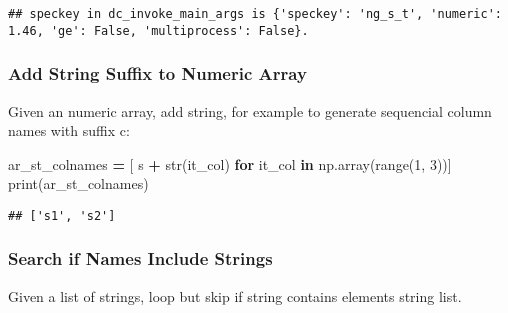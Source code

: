 \documentclass[
]{book}
\newenvironment{Shaded}{\begin{snugshade}}{\end{snugshade}}
\newcommand{\BuiltInTok}[1]{#1}
\newcommand{\ControlFlowTok}[1]{\textcolor[rgb]{0.13,0.29,0.53}{\textbf{#1}}}
\newcommand{\DecValTok}[1]{\textcolor[rgb]{0.00,0.00,0.81}{#1}}
\newcommand{\KeywordTok}[1]{\textcolor[rgb]{0.13,0.29,0.53}{\textbf{#1}}}
\newcommand{\NormalTok}[1]{#1}
\newcommand{\OperatorTok}[1]{\textcolor[rgb]{0.81,0.36,0.00}{\textbf{#1}}}
\newcommand{\StringTok}[1]{\textcolor[rgb]{0.31,0.60,0.02}{#1}}
\begin{document}
\begin{verbatim}
## speckey in dc_invoke_main_args is {'speckey': 'ng_s_t', 'numeric': 1.46, 'ge': False, 'multiprocess': False}.
\end{verbatim}

\hypertarget{add-string-suffix-to-numeric-array}{%
\subsubsection{Add String Suffix to Numeric Array}\label{add-string-suffix-to-numeric-array}}

Given an numeric array, add string, for example to generate sequencial column names with suffix c:

\begin{Shaded}
\begin{Highlighting}[]
\NormalTok{ar\_st\_colnames }\OperatorTok{=}\NormalTok{ [ }\StringTok{\textquotesingle{}s\textquotesingle{}} \OperatorTok{+} \BuiltInTok{str}\NormalTok{(it\_col) }\ControlFlowTok{for}\NormalTok{ it\_col }\KeywordTok{in}\NormalTok{ np.array(}\BuiltInTok{range}\NormalTok{(}\DecValTok{1}\NormalTok{, }\DecValTok{3}\NormalTok{))]}
\BuiltInTok{print}\NormalTok{(ar\_st\_colnames)}
\end{Highlighting}
\end{Shaded}

\begin{verbatim}
## ['s1', 's2']
\end{verbatim}

\hypertarget{search-if-names-include-strings}{%
\subsubsection{Search if Names Include Strings}\label{search-if-names-include-strings}}

Given a list of strings, loop but skip if string contains elements string list.
\end{document}
